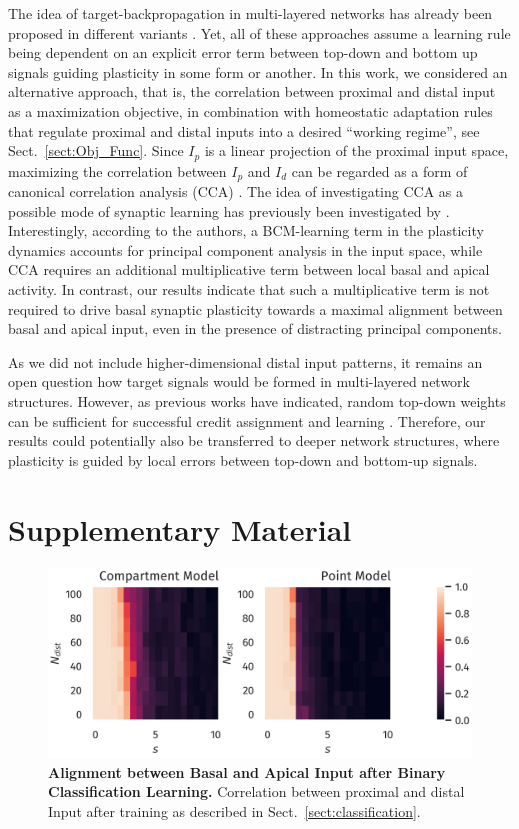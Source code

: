 \documentclass[utf8]{frontiersSCNS} %
\begin{document}
The idea of target-backpropagation in multi-layered networks
has already been proposed in different variants
\cite{Bengio2014,Lee2015,Guerguiev2017}. Yet, all of these approaches
assume a learning rule being dependent on an explicit error term 
between top-down and bottom up signals guiding plasticity in some form
or another. In this work, we considered an alternative approach, that is,
the correlation between proximal and distal input as a maximization
objective, in combination with homeostatic adaptation rules that regulate
proximal and distal inputs into a desired ``working regime'', 
see Sect.~\ref{sect:Obj_Func}. 
Since $I_p$ is a linear projection of the 
proximal input space, maximizing the correlation between
$I_p$ and $I_d$ can be regarded as a form of canonical correlation
analysis (CCA) \cite{Haerdle2007}. The idea of investigating CCA as a
possible mode of synaptic learning has previously been investigated by
\citet{Haga2018}. Interestingly, according to the authors, a 
BCM-learning term in the plasticity dynamics accounts for principal component
analysis in the input space, while CCA requires an additional multiplicative
term between local basal and apical activity. In contrast, our results
indicate that such a multiplicative term is not required to drive basal
synaptic plasticity towards a maximal alignment between basal and apical
input, even in the presence of distracting principal components.

As we did not include higher-dimensional distal input patterns, it
remains an open question how target signals would be formed in
multi-layered network structures. However, as previous works have
indicated, random top-down weights can be sufficient for
successful credit assignment and learning \cite{Lillicrap2016,Guerguiev2017}.
Therefore, our results could potentially also be transferred to deeper
network structures, where plasticity is guided by local errors between
top-down and bottom-up signals.

\section{Supplementary Material}
\begin{figure}
\centering
\includegraphics[width=0.7\columnwidth]{classification_correlation_dimension_scaling_high_input_dim}
\caption{{\bf Alignment between Basal and Apical Input after Binary Classification Learning.}
	Correlation between proximal and distal Input after training as described in 
	Sect.~\ref{sect:classification}.}
\label{fig:classification_correlation}
\end{figure}
\end{document}
